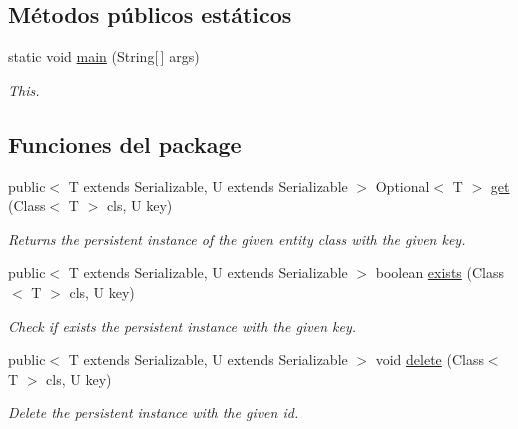 \subsection*{Métodos públicos estáticos}
\begin{DoxyCompactItemize}
\item 
static void \mbox{\hyperlink{classcom_1_1ruralhousejsf_1_1business_logic_1_1_application_facade_impl_a19d9b0706fe39437efc379c3bc747e06}{main}} (String\mbox{[}$\,$\mbox{]} args)
\begin{DoxyCompactList}\small\item\em This. \end{DoxyCompactList}\end{DoxyCompactItemize}
\subsection*{Funciones del \textquotesingle{}package\textquotesingle{}}
\begin{DoxyCompactItemize}
\item 
public$<$ T extends Serializable, U extends Serializable $>$ Optional$<$ T $>$ \mbox{\hyperlink{classcom_1_1ruralhousejsf_1_1business_logic_1_1_application_facade_impl_aab772c94cd469793cc01ec1418e29763}{get}} (Class$<$ T $>$ cls, U key)
\begin{DoxyCompactList}\small\item\em Returns the persistent instance of the given entity class with the given key. \end{DoxyCompactList}\item 
public$<$ T extends Serializable, U extends Serializable $>$ boolean \mbox{\hyperlink{classcom_1_1ruralhousejsf_1_1business_logic_1_1_application_facade_impl_a2a873fe74350d41be72c6fde461351fd}{exists}} (Class$<$ T $>$ cls, U key)
\begin{DoxyCompactList}\small\item\em Check if exists the persistent instance with the given key. \end{DoxyCompactList}\item 
public$<$ T extends Serializable, U extends Serializable $>$ void \mbox{\hyperlink{classcom_1_1ruralhousejsf_1_1business_logic_1_1_application_facade_impl_a9a11ee0688c0a679574bb3edb260f927}{delete}} (Class$<$ T $>$ cls, U key)
\begin{DoxyCompactList}\small\item\em Delete the persistent instance with the given id. \end{DoxyCompactList}\end{DoxyCompactItemize}
